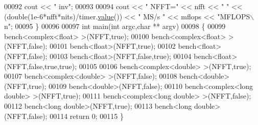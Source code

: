 \begin{DoxyCode}
00092         cout << \textcolor{stringliteral}{" inv"};
00093 
00094     cout << \textcolor{stringliteral}{" NFFT="} << nfft << \textcolor{stringliteral}{"  "} << (double(1e-6*nfft*nits)/timer.\hyperlink{class_eigen_1_1_bench_timer_a26760f963ed8b64c126159bfea57735e}{value}()) << \textcolor{stringliteral}{" MS/s  "} << mflops 
      << \textcolor{stringliteral}{"MFLOPS\(\backslash\)n"};
00095 \}
00096 
00097 \textcolor{keywordtype}{int} main(\textcolor{keywordtype}{int} argc,\textcolor{keywordtype}{char} ** argv)
00098 \{
00099     bench<complex<float> >(NFFT,\textcolor{keyword}{true});
00100     bench<complex<float> >(NFFT,\textcolor{keyword}{false});
00101     bench<float>(NFFT,\textcolor{keyword}{true});
00102     bench<float>(NFFT,\textcolor{keyword}{false});
00103     bench<float>(NFFT,\textcolor{keyword}{false},\textcolor{keyword}{true});
00104     bench<float>(NFFT,\textcolor{keyword}{false},\textcolor{keyword}{true},\textcolor{keyword}{true});
00105 
00106     bench<complex<double> >(NFFT,\textcolor{keyword}{true});
00107     bench<complex<double> >(NFFT,\textcolor{keyword}{false});
00108     bench<double>(NFFT,\textcolor{keyword}{true});
00109     bench<double>(NFFT,\textcolor{keyword}{false});
00110     bench<complex<long double> >(NFFT,\textcolor{keyword}{true});
00111     bench<complex<long double> >(NFFT,\textcolor{keyword}{false});
00112     bench<long double>(NFFT,\textcolor{keyword}{true});
00113     bench<long double>(NFFT,\textcolor{keyword}{false});
00114     \textcolor{keywordflow}{return} 0;
00115 \}
\end{DoxyCode}
